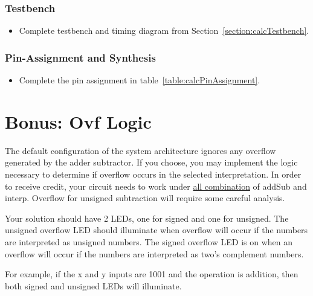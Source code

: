 \subsubsection{Testbench}
\begin{itemize}
\item Complete testbench and timing diagram from Section~\ref{section:calcTestbench}.
\end{itemize}

\subsubsection{Pin-Assignment and Synthesis}
\begin{itemize}
\item Complete the pin assignment in table~\ref{table:calcPinAssignment}.
\end{itemize}

\section{Bonus: Ovf Logic}

The default configuration of the system architecture ignores any
overflow generated by the adder subtractor. If you choose, you may
implement the logic necessary to determine if overflow occurs in the
selected interpretation. In order to receive credit, your circuit needs
to work under \uline{all combination} of addSub and interp. Overflow for
unsigned subtraction will require some careful analysis.

Your solution should have 2 LEDs, one for signed and one for unsigned.
The unsigned overflow LED should illuminate when overflow will occur if
the numbers are interpreted as unsigned numbers. The signed overflow LED
is on when an overflow will occur if the numbers are interpreted as
two's complement numbers.

For example, if the x and y inputs are 1001 and the operation is
addition, then both signed and unsigned LEDs will illuminate.